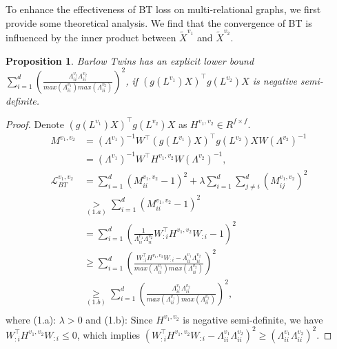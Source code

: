 \documentclass[letterpaper]{article} %
\newtheorem{proposition}{Proposition}
\begin{document}
To enhance the effectiveness of BT loss on
multi-relational graphs, we first provide some theoretical analysis. We find that the convergence of BT is influenced by the inner product between $\widetilde{X}^{v_1}$ and $\widetilde{X}^{v_2}$.


\begin{proposition}\label{proposition1}
Barlow Twins has an explicit lower bound $\sum_{i=1}^d (\frac{\Lambda^{v_1}_{ii} \Lambda^{v_2}_{ii}}{max(\Lambda^{v_1}_{ii}) max(\Lambda^{v_2}_{ii})})^2$, if $(g(L^{v_{1}})X)^{\top} g(L^{v_{2}}) X$ is negative semi-definite.
\end{proposition}



\begin{proof}
Denote $(g(L^{v_1})X)^{\top} g(L^{v_2}) X $ as $H^{v_1, v_2} \in R^{f \times f}.$
\begin{equation}\label{proof1}
\begin{aligned}
    M^{v_1, v_2}
    &= (\Lambda^{v_1})^{-1} {W}^{\top} (g(L^{v_1})X)^{\top} g(L^{v_2}) X W (\Lambda^{v_2})^{-1} \\
    &= (\Lambda^{v_1})^{-1}{W}^{\top} H^{v_1, v_2} W (\Lambda^{v_2})^{-1},
    \\
    \mathcal{L}^{v_1,v_2}_{BT}
    &=\sum_{i=1}^{d}\left(M^{v_1,v_2}_{i i}-1\right)^{2}+\lambda \sum_{i=1}^{d} \sum_{j \neq i}^d (M^{v_1,v_2}_{i j})^{2}\\
    & \underset{(1.a)}{>} \sum_{i=1}^{d}\left(M^{v_1, v_2}_{i i}-1\right)^{2}\\
    &= \sum_{i=1}^{d} (\frac{1}{\Lambda^{v_1}_{ii} \Lambda^{v_2}_{ii}} {W}_{:i}^{\top} H^{v_1, v_2} {W}_{:i}-1)^{2}\\
    & \geq \sum_{i=1}^{d} (\frac{{W}_{:i}^{\top} H^{v_1, v_2} {W}_{:i}-\Lambda^{v_1}_{ii} \Lambda^{v_2}_{ii}}{max(\Lambda^{v_1}_{ii}) max(\Lambda^{v_2}_{ii})})^{2}\\
    & \underset{(1.b)}{\geq} \sum_{i=1}^{d} (\frac{\Lambda^{v_1}_{ii} \Lambda^{v_2}_{ii}}{max(\Lambda^{v_1}_{ii}) max(\Lambda^{v_2}_{ii})})^{2},\\
\end{aligned}
\end{equation}
where (1.a): $\lambda > 0$ and
(1.b): Since $H^{v_1, v_2}$ is negative semi-definite, we have
${W}_{:i}^{\top} H^{v_1, v_2} {W}_{:i} \leq 0$, which implies $({W}_{:i}^{\top} H^{v_1, v_2} {W}_{:i}-\Lambda^{v_1}_{ii} \Lambda^{v_2}_{ii})^{2} \geq (\Lambda^{v_1}_{ii} \Lambda^{v_2}_{ii})^{2}.$
\end{proof}
\end{document}
